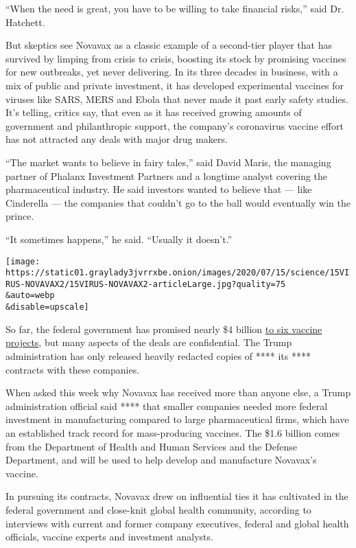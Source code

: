 ``When the need is great, you have to be willing to take financial
risks,'' said Dr. Hatchett.

But skeptics see Novavax as a classic example of a second-tier player
that has survived by limping from crisis to crisis, boosting its stock
by promising vaccines for new outbreaks, yet never delivering. In its
three decades in business, with a mix of public and private investment,
it has developed experimental vaccines for viruses like SARS, MERS and
Ebola that never made it past early safety studies. It's telling,
critics say, that even as it has received growing amounts of government
and philanthropic support, the company's coronavirus vaccine effort has
not attracted any deals with major drug makers.

``The market wants to believe in fairy tales,'' said David Maris, the
managing partner of Phalanx Investment Partners and a longtime analyst
covering the pharmaceutical industry. He said investors wanted to
believe that --- like Cinderella --- the companies that couldn't go to
the ball would eventually win the prince.

``It sometimes happens,'' he said. ``Usually it doesn't.''

\texttt{[image: https://static01.graylady3jvrrxbe.onion/images/2020/07/15/science/15VIRUS-NOVAVAX2/15VIRUS-NOVAVAX2-articleLarge.jpg?quality=75\\\&auto=webp\\\&disable=upscale]}

So far, the federal government has promised nearly \$4 billion
\href{https://medicalcountermeasures.gov/app/barda/coronavirus/COVID19.aspx}{to
six vaccine projects}, but many aspects of the deals are confidential.
The Trump administration has only released heavily redacted copies of
**** its **** contracts with these companies.

When asked this week why Novavax has received more than anyone else, a
Trump administration official said **** that smaller companies needed
more federal investment in manufacturing compared to large
pharmaceutical firms, which have an established track record for
mass-producing vaccines. The \$1.6 billion comes from the Department of
Health and Human Services and the Defense Department, and will be used
to help develop and manufacture Novavax's vaccine.

In pursuing its contracts, Novavax drew on influential ties it has
cultivated in the federal government and close-knit global health
community, according to interviews with current and former company
executives, federal and global health officials, vaccine experts and
investment analysts.

